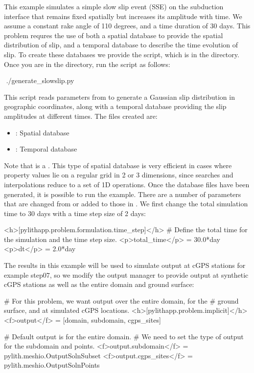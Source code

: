 This example simulates a simple slow slip event (SSE) on the
subduction interface that remains fixed spatially but increases its
amplitude with time. We assume a constant rake angle of 110 degrees,
and a time duration of 30 days. This problem requres the use of both a
spatial database to provide the spatial distribution of slip, and a
temporal database to describe the time evolution of slip. To create
these databases we provide the 
script, which is in the  directory. Once you are
in the  directory, run the script as follows:
\begin{shell}
$$ ./generate_slowslip.py
\end{shell}
This script reads parameters from  to
generate a Gaussian slip distribution in geographic coordinates, along
with a temporal database providing the slip amplitudes at different
times. The files created are:
\begin{itemize}
\item {}: Spatial database
\item {}: Temporal database
\end{itemize}

Note that  is a
. This type of spatial database is very
efficient in cases where property values lie on a regular grid in 2 or
3 dimensions, since searches and interpolations reduce to a set of 1D
operations. Once the database files have been generated, it is
possible to run the example. There are a number of parameters that are
changed from or added to those in . We first
change the total simulation time to 30 days with a time step size of 2
days:
\begin{cfg}
<h>[pylithapp.problem.formulation.time_step]</h>
# Define the total time for the simulation and the time step size.
<p>total_time</p> = 30.0*day
<p>dt</p> = 2.0*day
\end{cfg}

The results in this example will be used to simulate output at cGPS
stations for example step07, so we modify the output manager to
provide output at synthetic cGPS stations as well as the entire domain
and ground surface:
\begin{cfg}
# For this problem, we want output over the entire domain, for the
# ground surface, and at simulated cGPS locations.
<h>[pylithapp.problem.implicit]</h>
<f>output</f> = [domain, subdomain, cgps_sites]

# Default output is for the entire domain.
# We need to set the type of output for the subdomain and points.
<f>output.subdomain</f> = pylith.meshio.OutputSolnSubset
<f>output.cgps_sites</f> = pylith.meshio.OutputSolnPoints
\end{cfg}


